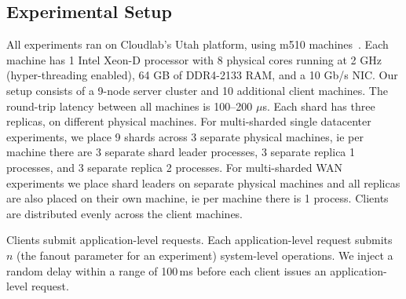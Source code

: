 
\subsection{Experimental Setup}
All experiments ran on Cloudlab's Utah platform, using
m510 machines~\cite{duplyakin2019cloudlab}.  Each machine has 1 Intel Xeon-D processor with 8 physical cores
running at 2 GHz (hyper-threading enabled), 64 GB of DDR4-2133 RAM, and a 10
Gb/s NIC\@.  Our setup consists of a 9-node server cluster and 10 additional client machines.
The round-trip latency between all machines is 100--200 $\mu$s.  Each shard has three replicas,
on different physical machines. For multi-sharded single datacenter experiments, we place 9 shards across 3 separate physical machines, ie per machine there are 3 separate shard leader processes, 3 separate replica 1 processes, and 3 separate replica 2 processes. For multi-sharded WAN experiments we place shard leaders on separate physical machines and all replicas are also placed on their own machine, ie per machine there is 1 process. Clients are distributed
evenly across the client machines.





Clients submit application-level requests. Each application-level request
submits $n$ (the fanout parameter for an experiment) system-level operations. We inject a random delay within a range of 100\,ms before each client issues an application-level request.

